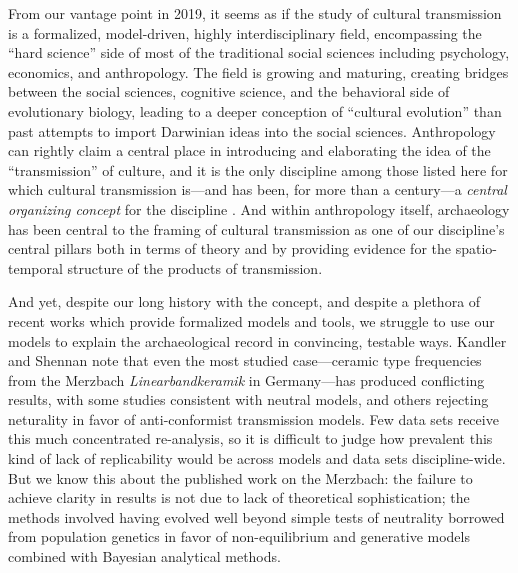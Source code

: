 
From our vantage point in 2019, it seems as if the study of cultural transmission is a formalized, model-driven, highly interdisciplinary field, encompassing the ``hard science'' side of most of the traditional social sciences including psychology, economics, and anthropology.  The field is growing and maturing, creating bridges between the social sciences, cognitive science, and the behavioral side of evolutionary biology, leading to a deeper conception of ``cultural evolution'' than past attempts to import Darwinian ideas into the social sciences.  Anthropology can rightly claim a central place in introducing and elaborating the idea of the ``transmission'' of culture, and it is the only discipline among those listed here for which cultural transmission is---and has been, for more than a century---a \emph{central organizing concept} for the discipline \citep{lyman2008cultural}.  And within anthropology itself, archaeology has been central to the framing of cultural transmission as one of our discipline's central pillars both in terms of theory and by providing evidence for the spatio-temporal structure of the products of transmission.

And yet, despite our long history with the concept, and despite a plethora of recent works which provide formalized models and tools, we struggle to use our models to explain the archaeological record in convincing, testable ways.  Kandler and Shennan \citeyearpar{Kandler20150905} note that even the most studied case---ceramic type frequencies from the Merzbach \emph{Linearbandkeramik} in Germany---has produced conflicting results, with some studies consistent with neutral models, and others rejecting neturality in favor of anti-conformist transmission models.  Few data sets receive this much concentrated re-analysis, so it is difficult to judge how prevalent this kind of lack of replicability would be across models and data sets discipline-wide.  But we know this about the published work on the Merzbach:  the failure to achieve clarity in results is not due to lack of theoretical sophistication; the methods involved having evolved well beyond simple tests of neutrality borrowed from population genetics in favor of non-equilibrium and generative models combined with Bayesian analytical methods.  

